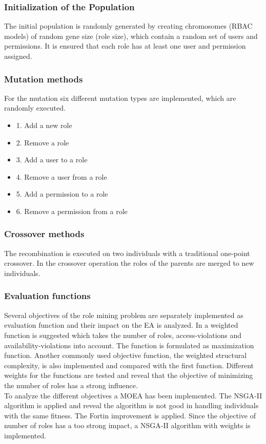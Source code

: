     \subsubsection{Initialization of the Population}
    The initial population is randomly generated by creating chromosomes (RBAC models) of random gene size (role size), which contain a random set of users and permissions. It is ensured that each role has at least one user and permission assigned.
    
    \subsubsection{Mutation methods}
    For the mutation six different mutation types are implemented, which are randomly executed.
    \begin{itemize}
        \item 1. Add a new role
        \item 2. Remove a role
        \item 3. Add a user to a role
        \item 4. Remove a user from a role
        \item 5. Add a permission to a role
        \item 6. Remove a permission from a role
    \end{itemize}
    
    \subsubsection{Crossover methods}
    The recombination is executed on two individuals with a traditional one-point crossover. In the crossover operation the roles of the parents are merged to new individuals.
    
    \subsubsection{Evaluation functions}
    Several objectives of the role mining problem are separately implemented as evaluation function and their impact on the EA is analyzed. In \cite{saenko2012design} a weighted function is suggested which takes the number of roles, access-violations and availability-violations into account. The function is formulated as maximization function. Another commonly used objective function, the weighted structural complexity, is also implemented and compared with the first function. Different weights for the functions are tested and reveal that the objective of minimizing the number of roles has a strong influence.\\
    To analyze the different objectives a MOEA has been implemented. The NSGA-II algorithm is applied and reveal the algorithm is not good in handling individuals with the same fitness. The Fortin improvement is applied. Since the objective of number of roles has a too strong impact, a NSGA-II algorithm with weights is implemented.
    

